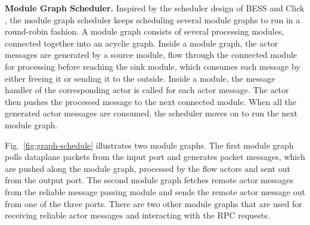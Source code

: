 

\noindent \textbf{Module Graph Scheduler.} Inspired by the scheduler design of BESS \cite{bess} and Click \cite{kohler2000click}, the module graph scheduler keeps scheduling several module graphs to run in a round-robin fashion. A module graph consists of several processing modules, connected together into an acyclic graph. Inside a module graph, the actor messages are generated by a source module, flow through the connected module for processing before reaching the sink module, which consumes each message by either freeing it or sending it to the outside. Inside a module, the message handler of the corresponding actor is called for each actor message. The actor then pushes the processed message to the next connected module. When all the generated actor messages are consumed, the scheduler moves on to run the next module graph. %

Fig.~\ref{fig:graph-schedule} illustrates two module graphs. The first module graph polls dataplane packets from the input port and generates packet messages, which are pushed along the module graph, processed by the flow actors and sent out from the output port. The second module graph fetches remote actor messages from the reliable message passing module and sends the remote actor message out from one of the three ports. There are two other module graphs that are used for receiving reliable actor messages and interacting with the RPC requests.


